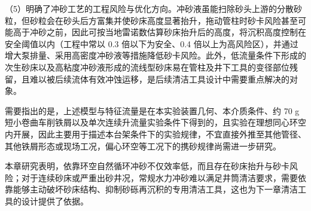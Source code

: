 （5）明确了冲砂工艺的工程风险与优化方向。冲砂液虽能扫除砂头上游的分散砂粒，但砂粒会在砂头后方富集并使砂床高度显著抬升，拖动管柱时砂卡风险甚至可能高于冲砂之前，因此可按当地雷诺数估算砂床抬升后的高度，将沉积高度控制在安全阈值以内（工程中常以 0.3 倍以下为安全、0.4 倍以上为高风险区），并通过增大泵排量、采用高密度冲砂液等措施降低砂卡风险。此外，低流量条件下形成的次生砂床以及高粘度冲砂液形成的流线型砂床易在管柱及井下工具的变径部位残留，且难以被后续流体有效冲蚀运移，是后续清洁工具设计中需要重点解决的对象。

需要指出的是，上述模型与特征流量是在本实验装置几何、本介质条件、约 70 g 短小卷曲车削铁屑以及单次连续升流量实验条件下得到的，且实验在理想同心环空内开展，因此主要用于描述本台架条件下的实验规律，不宜直接外推至其他管径、其他铁屑形态或现场工况，偏心环空等工况下的携砂规律尚需进一步研究。

本章研究表明，依靠环空自然循环冲砂不仅效率低，而且存在砂床抬升与砂卡风险；对于连续砂床或严重出砂井况，常规水力冲砂难以满足井筒清洁要求，需要依靠能够主动破坏砂床结构、抑制砂砾再沉积的专用清洁工具，这也为下一章清洁工具的设计提供了依据。

